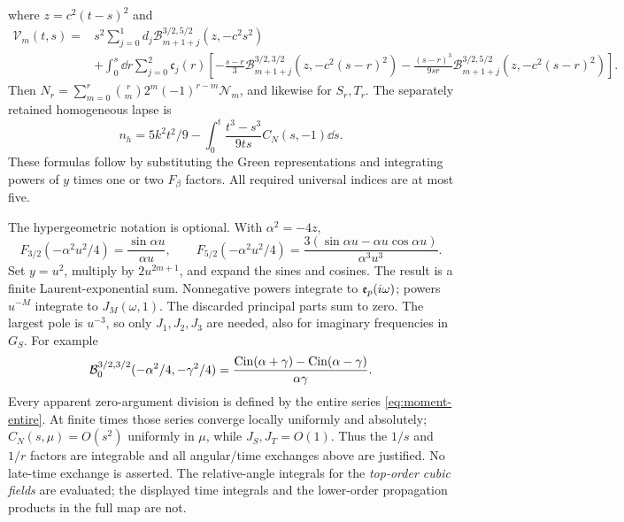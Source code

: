 where $z=c^2(t-s)^2$ and
\begin{equation}\label{eq:moment-V}
\begin{split}
 \mathcal V_m(t,s)={}&s^2\sum_{j=0}^1d_j\mathscr B_{m+1+j}^{3/2,5/2}(z,-c^2s^2)\\
 &+\int_0^s\dd r\sum_{j=0}^2\mathfrak c_j(r)
 \left[-\frac{s-r}{3}\mathscr B_{m+1+j}^{3/2,3/2}(z,-c^2(s-r)^2)
 -\frac{(s-r)^3}{9sr}\mathscr B_{m+1+j}^{3/2,5/2}(z,-c^2(s-r)^2)\right].
\end{split}
\end{equation}
Then $N_r=\sum_{m=0}^r\binom{r}{m}2^m(-1)^{r-m}\mathcal N_m$, and likewise for
$S_r,T_r$. The separately retained homogeneous lapse is
\begin{equation}\label{eq:moment-homogeneous}
 n_h=5k^2t^2/9-\int_0^t\frac{t^3-s^3}{9ts}C_N(s,-1)\dd s.
\end{equation}
These formulas follow by substituting the Green representations and integrating powers of
$y$ times one or two $F_\beta$ factors. All required universal indices are at most five.

The hypergeometric notation is optional. With $\alpha^2=-4z$,
\[
 F_{3/2}(-\alpha^2u^2/4)=\frac{\sin\alpha u}{\alpha u},\qquad
 F_{5/2}(-\alpha^2u^2/4)=\frac{3(\sin\alpha u-\alpha u\cos\alpha u)}{\alpha^3u^3}.
\]
Set $y=u^2$, multiply by $2u^{2m+1}$, and expand the sines and cosines. The result is a finite
Laurent-exponential sum. Nonnegative powers integrate to $\mathfrak{e}_p(i\omega)$; powers $u^{-M}$
integrate to $J_M(\omega,1)$. The discarded principal parts sum to zero. The largest pole is
$u^{-3}$, so only $J_1,J_2,J_3$ are needed, also for imaginary frequencies in $G_S$.
For example
\[
 \mathcal B_0^{3/2,3/2}(-\alpha^2/4,-\gamma^2/4)
 =\frac{\operatorname{Cin}(\alpha+\gamma)-\operatorname{Cin}(\alpha-\gamma)}{\alpha\gamma}.
\]
Every apparent zero-argument division is defined by the entire series
\eqref{eq:moment-entire}. At finite times those series converge locally uniformly and
absolutely; $C_N(s,\mu)=O(s^2)$ uniformly in $\mu$, while $J_S,J_T=O(1)$.
Thus the $1/s$ and $1/r$ factors are integrable and all angular/time exchanges above are
justified. No late-time exchange is asserted. The relative-angle integrals for the
\emph{top-order cubic fields} are evaluated; the displayed time integrals and the
lower-order propagation products in the full map are not.
